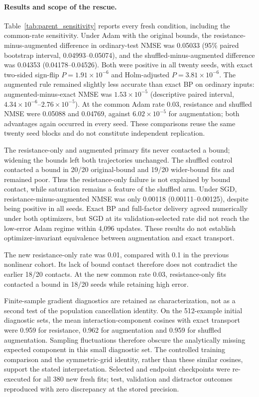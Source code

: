\paragraph{Results and scope of the rescue.}
Table~\ref{tab:parent_sensitivity} reports every fresh condition, including
the common-rate sensitivity. Under Adam with the original bounds, the
resistance-minus-augmented difference in ordinary-test NMSE was 0.05033
(95\% paired bootstrap interval, 0.04993--0.05074), and the
shuffled-minus-augmented difference was 0.04353 (0.04178--0.04526).
Both were positive in all twenty seeds, with exact two-sided sign-flip
$P=1.91\times10^{-6}$ and Holm-adjusted $P=3.81\times10^{-6}$.
The augmented rule remained slightly less accurate than exact BP on
ordinary inputs: augmented-minus-exact NMSE was $1.53\times10^{-5}$
(descriptive paired interval, $4.34\times10^{-6}$--$2.76\times10^{-5}$).
At the common Adam rate 0.03, resistance and shuffled NMSE were 0.05088
and 0.04769, against $6.02\times10^{-5}$ for augmentation; both advantages
again occurred in every seed. These comparisons reuse the same twenty
seed blocks and do not constitute independent replication.

The resistance-only and augmented primary fits never contacted a bound;
widening the bounds left both trajectories unchanged. The shuffled
control contacted a bound in 20/20 original-bound and 19/20 wider-bound
fits and remained poor. Thus the resistance-only failure is not explained
by bound contact, while saturation remains a feature of the shuffled
arm. Under SGD, resistance-minus-augmented NMSE was only 0.00118
(0.00111--0.00125), despite being positive in all seeds. Exact BP and
full-factor delivery agreed numerically under both optimizers, but SGD
at its validation-selected rate did not reach the low-error Adam regime
within 4,096 updates. These results do not establish optimizer-invariant
equivalence between augmentation and exact transport.

The new resistance-only rate was 0.01, compared with 0.1 in the previous
nonlinear cohort. Its lack of bound contact therefore does not contradict
the earlier 18/20 contacts. At the new common rate 0.03, resistance-only
fits contacted a bound in 18/20 seeds while retaining high error.

Finite-sample gradient diagnostics are retained as characterization, not
as a second test of the population cancellation identity. On the
512-example initial diagnostic sets, the mean interaction-component
cosines with exact transport were 0.959 for resistance, 0.962 for
augmentation and 0.959 for shuffled augmentation. Sampling fluctuations
therefore obscure the analytically missing expected component in this
small diagnostic set. The controlled training comparison and the
symmetric-grid identity, rather than these similar cosines, support
the stated interpretation. Selected and endpoint checkpoints were
re-executed for all 380 new fresh fits; test, validation and distractor
outcomes reproduced with zero discrepancy at the stored precision.
